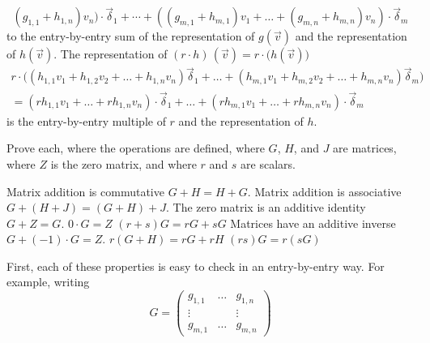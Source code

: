 \begin{exercises}
\begin{answer}
\begin{exparts}
\begin{equation*}
                 (g_{1,1}+h_{1,n})v_n)\cdot\vec{\delta}_1       
            +\cdots                            
           +((g_{m,1}+h_{m,1})v_1+\dots+
                 (g_{m,n}+h_{m,n})v_n)\cdot\vec{\delta}_m
        \end{equation*} 
        to the entry-by-entry
        sum of the representation of \( g(\vec{v}) \) and the representation of
        \( h(\vec{v}) \).
      \partsitem The representation of
        $(r\cdot h)\,(\vec{v})=r\cdot \bigl(h(\vec{v})\bigr)$
        \begin{multline*}
          r\cdot \bigl(
               (h_{1,1}v_1+h_{1,2}v_2+\dots+h_{1,n}v_n)\vec{\delta}_1  
               +\dots      
               +(h_{m,1}v_1+h_{m,2}v_2+\dots+h_{m,n}v_n)\vec{\delta}_m\bigr) \\
          =(rh_{1,1}v_1+\dots+rh_{1,n}v_n)\cdot\vec{\delta}_1           
          +\dots                                    
          +(rh_{m,1}v_1+\dots+rh_{m,n}v_n)\cdot\vec{\delta}_m
        \end{multline*}
        is the  entry-by-entry
        multiple of \( r \) and the representation of \( h \).
     \end{exparts}  
   \end{answer}
  \recommended \item
    Prove each, where the operations are defined, where \( G \), \( H \), and 
    \( J \) are matrices, where
    \( Z \) is the zero matrix, and where \( r \) and \( s \) are scalars.
    \begin{exparts}
      \partsitem Matrix addition is commutative \( G+H=H+G \).
      \partsitem Matrix addition is associative \( G+(H+J)=(G+H)+J \).
      \partsitem The zero matrix is an additive identity \( G+Z=G \).
      \partsitem \( 0\cdot G=Z \)
      \partsitem \( (r+s)G=rG+sG \)
      \partsitem Matrices have an additive inverse \( G+(-1)\cdot G=Z \).
      \partsitem \( r(G+H)=rG+rH \)
      \partsitem \( (rs)G=r(sG) \)
    \end{exparts}
    \begin{answer}
      First, each of these properties
      is easy to check in an entry-by-entry way.
      For example, writing
      \begin{equation*}
        G=
        \begin{pmatrix}
          g_{1,1}  &\ldots  &g_{1,n}  \\
          \vdots   &        &\vdots   \\
          g_{m,1}  &\ldots  &g_{m,n}       
        \end{pmatrix}

\end{equation*}
\end{answer}
\end{exercises}
